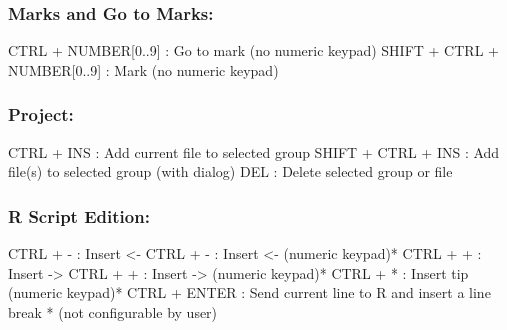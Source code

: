 \subsubsection{Marks and Go to Marks:}

\vspace{-0.5cm}
\begin{Rtables}[caption={[Marks and go to marks keyboard shortcuts]
    Marks and go to marks keyboard shortcuts},
  label=hotkey:marks]
  CTRL  + NUMBER[0..9]        : Go to mark (no numeric keypad)
  SHIFT + CTRL + NUMBER[0..9] : Mark (no numeric keypad)
\end{Rtables}


\subsubsection{Project:}

\vspace{-0.5cm}
\begin{Rtables}[caption={[Project keyboard shortcuts]
    Project keyboard shortcuts},
  label=hotkey:project]
  CTRL  + INS             : Add current file to selected group
  SHIFT + CTRL + INS      : Add file(s) to selected group (with dialog)
  DEL                     : Delete selected group or file
\end{Rtables}


\subsubsection{R Script Edition:}

\vspace{-0.5cm}
\begin{Rtables}[caption={[R script edition keyboard shortcuts]
    R script edition keyboard shortcuts},
  label=hotkey:rscript]
  CTRL + -                : Insert <-
  CTRL + -                : Insert <-  (numeric keypad)*
  CTRL + +                : Insert ->
  CTRL + +                : Insert ->  (numeric keypad)*
  CTRL + *                : Insert tip (numeric keypad)*
  CTRL + ENTER            : Send current line to R and insert a line break
  * (not configurable by user)
\end{Rtables}


